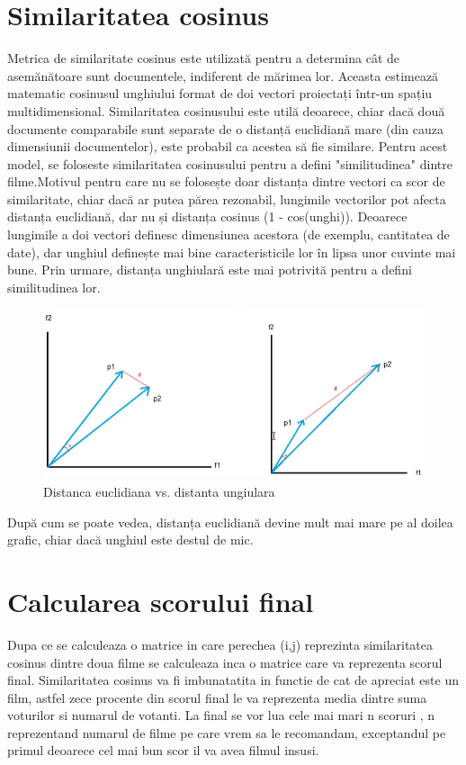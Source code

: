 \section{Similaritatea cosinus }
\par Metrica de similaritate cosinus este utilizată pentru a determina cât de asemănătoare sunt documentele, indiferent de mărimea lor. Aceasta estimează matematic cosinusul unghiului format de doi vectori proiectați într-un spațiu multidimensional. Similaritatea cosinusului este utilă deoarece, chiar dacă două documente comparabile sunt separate de o distanță euclidiană mare (din cauza dimensiunii documentelor), este probabil ca acestea să fie similare. Pentru acest model, se foloseste similaritatea cosinusului pentru a defini "similitudinea" dintre filme.Motivul pentru care nu se folosește doar distanța dintre vectori ca scor de similaritate, chiar dacă ar putea părea rezonabil, lungimile vectorilor pot afecta distanța euclidiană, dar nu și distanța cosinus (1 - cos(unghi)). Deoarece lungimile a doi vectori definesc dimensiunea acestora (de exemplu, cantitatea de date), dar unghiul definește mai bine caracteristicile lor în lipsa unor cuvinte mai bune. Prin urmare, distanța unghiulară este mai potrivită pentru a defini similitudinea lor.
		\begin{figure}[htbp]
			\centerline{\includegraphics[width=12cm, height=5cm]{figures/grafic distanta.png}}
			\caption{Distanca euclidiana vs. distanta ungiulara}
			\label{fig}
		\end{figure}
\par După cum se poate  vedea, distanța euclidiană devine mult mai mare pe al doilea grafic, chiar dacă unghiul este destul de mic.

\section{Calcularea scorului final}
\par Dupa ce se calculeaza o matrice in care perechea (i,j) reprezinta similaritatea cosinus dintre doua filme se calculeaza inca o matrice care va reprezenta scorul final. Similaritatea cosinus va fi imbunatatita in functie de cat de apreciat este un film, astfel zece procente din scorul final le va reprezenta media dintre suma voturilor si numarul de votanti. La final se vor lua cele mai mari n scoruri , n reprezentand numarul de filme pe care vrem sa le recomandam, exceptandul pe primul deoarece cel mai bun scor il va avea filmul insusi.